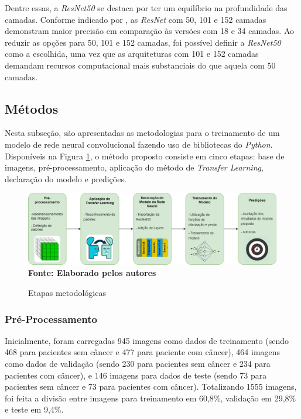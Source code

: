 Dentre essas, a \textit{ResNet50} se destaca por ter um equilíbrio na profundidade das camadas. Conforme indicado por , as \textit{ResNet} com 50, 101 e 152 camadas demonstram maior precisão em comparação às versões com 18 e 34 camadas. Ao reduzir as opções para 50, 101 e 152 camadas, foi possível definir a \textit{ResNet50} como a escolhida, uma vez que as arquiteturas com 101 e 152 camadas demandam recursos computacional mais substanciais do que aquela com 50 camadas.





\subsection{\esp Métodos} \label{metodos}

Nesta subseção, são apresentadas as metodologias para o treinamento de um modelo de rede neural convolucional fazendo uso de bibliotecas do \textit{Python}. Disponíveis na Figura \ref{fig:diagrama}, o método proposto consiste em cinco etapas: base de imagens, pré-processamento, aplicação do método de \textit{Transfer Learning}, declaração do modelo e predições.

\begin{figure}[ht]
 	\centering	
 	\caption[\hspace{0.1cm}Grade Computacional.]{Etapas metodológicas}
 	\vspace{-0.2cm}
 	\includegraphics[width=1\textwidth]{figuras/tcc_diagrama.drawio.png}
    \captionsetup{justification=centering}
  \vspace{-0.2cm}
     \\\textbf{\footnotesize Fonte: Elaborado pelos autores}
	\label{fig:diagrama}
\end{figure}




\subsubsection{\esp Pré-Processamento} \label{preprocess}
Inicialmente, foram carregadas 945 imagens como dados de treinamento (sendo 468 para pacientes sem câncer e 477 para paciente com câncer), 464 imagens como dados de validação (sendo 230 para pacientes sem câncer e 234 para pacientes com câncer), e 146 imagens para dados de teste (sendo 73 para pacientes sem câncer e 73 para pacientes com câncer). Totalizando 1555 imagens, foi feita a divisão entre imagens para treinamento em 60,8\%, validação em 29,8\% e teste em 9,4\%.

